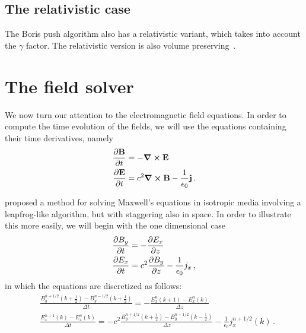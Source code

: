 \documentclass[12pt, class=report, crop=false]{standalone}
\begin{document}
\subsection{The relativistic case}

The Boris push algorithm also has a relativistic variant, which takes into account
the \(\gamma\) factor. The relativistic version is also volume
preserving~\autocite{higuera_structurepreservingsecondorder_2017}.

\section{The field solver}

We now turn our attention to the electromagnetic field equations. In order to
compute the time evolution of the fields, we will use the equations containing
their time derivatives, namely
\begin{align*}
  \pdv{\vb{B}}{t} & = - \curl{\vb{E}} \\
  \pdv{\vb{E}}{t} & = c^2 \curl{\vb{B}} - \frac{1}{\epsilon_0} \vb{j} \,.
\end{align*}

\Textcite{kaneyee_numericalsolution_1966} proposed a method for solving Maxwell's
equations in isotropic media involving a leapfrog-like algorithm, but with
staggering also in space. In order to illustrate this more easily, we will begin
with the one dimensional case
\begin{align*}
  \pdv{B_y}{t} & = - \pdv{E_x}{z} \\
  \pdv{E_x}{t} & = c^2 \pdv{B_y}{z} - \frac{1}{\epsilon_0} j_x \,,
\end{align*}
in which the equations are discretized as follows:
\begin{subequations}%
\label{eq:yee-1d}
\begin{align}
    &\frac{B_y^{n+1/2}(k+\frac{1}{2}) - B_y^{n-1/2}(k+\frac{1}{2})}{\Delta t} =
    - \frac{E_x^n(k+1) - E_x^n(k)}{\Delta z} \label{eq:yee-1d-faraday} \\
    &\frac{E_x^{n+1}(k) - E_x^{n}(k)}{\Delta t} =
    -c^2 \frac{B_y^{n+1/2}(k+\frac{1}{2}) - B_y^{n+1/2}(k-\frac{1}{2})}{\Delta z}
    -\frac{1}{\epsilon_0} j_x^{n+1/2}(k) \label{eq:yee-1d-ampere} \,.
\end{align}
\end{subequations}
\end{document}
